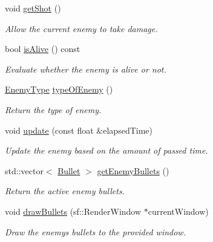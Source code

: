 \begin{DoxyCompactItemize}
\mbox{\label{class_enemy_a2faee7be0abbf8d473ecd6d7ee084e60}} 
void \hyperlink{class_enemy_a2faee7be0abbf8d473ecd6d7ee084e60}{get\+Shot} ()
\begin{DoxyCompactList}\small\item\em Allow the current enemy to take damage. \end{DoxyCompactList}\item 
\mbox{\label{class_enemy_a2801f42818600b19a7381dd2d1635af8}} 
bool \hyperlink{class_enemy_a2801f42818600b19a7381dd2d1635af8}{is\+Alive} () const
\begin{DoxyCompactList}\small\item\em Evaluate whether the enemy is alive or not. \end{DoxyCompactList}\item 
\mbox{\label{class_enemy_a7d8b3efe6d46b3c77446fe7f2a282a19}} 
\hyperlink{_enemy_8h_ac3e413a86119db4b031458c7259e268e}{Enemy\+Type} \hyperlink{class_enemy_a7d8b3efe6d46b3c77446fe7f2a282a19}{type\+Of\+Enemy} ()
\begin{DoxyCompactList}\small\item\em Return the type of enemy. \end{DoxyCompactList}\item 
void \hyperlink{class_enemy_a541b72a32e4a0217d58d1ee573c2f23a}{update} (const float \&elapsed\+Time)
\begin{DoxyCompactList}\small\item\em Update the enemy based on the amount of passed time. \end{DoxyCompactList}\item 
\mbox{\label{class_enemy_a849b23a3f78625911b0969506426d4da}} 
std\+::vector$<$ \hyperlink{class_bullet}{Bullet} $>$ \hyperlink{class_enemy_a849b23a3f78625911b0969506426d4da}{get\+Enemy\+Bullets} ()
\begin{DoxyCompactList}\small\item\em Return the active enemy bullets. \end{DoxyCompactList}\item 
void \hyperlink{class_enemy_ac0e1068fc766428d69d55b18e0fce0ca}{draw\+Bullets} (sf\+::\+Render\+Window $\ast$current\+Window)
\begin{DoxyCompactList}\small\item\em Draw the enemy\textquotesingle{}s bullets to the provided window. \end{DoxyCompactList}\item 

\end{DoxyCompactItemize}
